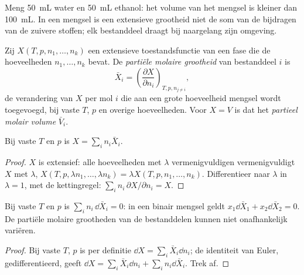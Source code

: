 Meng \qty{50}{mL} water en \qty{50}{mL} ethanol: het volume van het
mengsel is kleiner dan \qty{100}{mL}. In een mengsel is een extensieve grootheid
niet de som van de bijdragen van de zuivere stoffen; elk bestanddeel
draagt bij naargelang zijn omgeving.

\begin{definition}\label{def:b2:chemical-potential:partial-molar}
Zij $X(T, p, n_1, \dots, n_k)$ een extensieve toestandsfunctie van een fase
die de hoeveelheden $n_1, \dots, n_k$ bevat. De \emph{partiële molaire
grootheid} van bestanddeel $i$ is
\[
  \bar X_i = \left(\frac{\partial X}{\partial n_i}\right)_{T, p, n_{j \ne i}} ,
\]
de verandering van $X$ per mol $i$ die aan een grote hoeveelheid mengsel wordt toegevoegd,
bij vaste $T$, $p$ en overige hoeveelheden. Voor $X = V$ is dat het \emph{partieel
molair volume} $\bar V_i$.
\end{definition}

\begin{theorem}\label{thm:b2:chemical-potential:euler}
Bij vaste $T$ en $p$ is $X = \sum_i n_i\bar X_i$.
\end{theorem}

\begin{proof}
$X$ is extensief: alle hoeveelheden met $\lambda$ vermenigvuldigen vermenigvuldigt $X$ met
$\lambda$, $X(T, p, \lambda n_1, \dots, \lambda n_k) = \lambda X(T, p, n_1,
\dots, n_k)$. Differentieer naar $\lambda$ in $\lambda = 1$, met
de kettingregel: $\sum_i n_i\,\partial X/\partial n_i = X$.
\end{proof}

\begin{proposition}\label{prop:b2:chemical-potential:gibbs-duhem}
Bij vaste $T$ en $p$ is $\sum_i n_i\,\dd\bar X_i = 0$: in een binair mengsel
geldt $x_1\dd\bar X_1 + x_2\dd\bar X_2 = 0$. De partiële molaire grootheden van de
bestanddelen kunnen niet onafhankelijk variëren.
\end{proposition}

\begin{proof}
Bij vaste $T$, $p$ is per definitie $\dd X = \sum_i\bar X_i\dd n_i$; de identiteit
van Euler, gedifferentieerd, geeft $\dd X = \sum_i\bar X_i\dd n_i + \sum_i
n_i\dd\bar X_i$. Trek af.
\end{proof}

